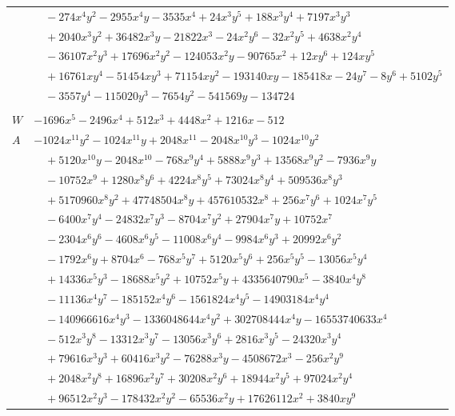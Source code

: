 \documentclass[11pt]{article}
\begin{document}
\begin{longtable}{@{}ll@{}}
 & $\quad -274x^{4}y^{2}-2955x^{4}y-3535x^{4}+24x^{3}y^{5}+188x^{3}y^{4}+7197x^{3}y^{3}$\\
 & $\quad +2040x^{3}y^{2}+36482x^{3}y-21822x^{3}-24x^{2}y^{6}-32x^{2}y^{5}+4638x^{2}y^{4}$\\
 & $\quad -36107x^{2}y^{3}+17696x^{2}y^{2}-124053x^{2}y-90765x^{2}+12xy^{6}+124xy^{5}$\\
 & $\quad +16761xy^{4}-51454xy^{3}+71154xy^{2}-193140xy-185418x-24y^{7}-8y^{6}+5102y^{5}$\\
 & $\quad -3557y^{4}-115020y^{3}-7654y^{2}-541569y-134724$\\
\addlinespace[3pt]
\multicolumn{2}{@{}l}{$g=2$, $i=35$, $m=16$, neighbours $2,4,9,12,13,18,20,21,29,34,39,40$}\\
$W$ & $-1696x^{5}-2496x^{4}+512x^{3}+4448x^{2}+1216x-512$\\
$A$ & $-1024x^{11}y^{2}-1024x^{11}y+2048x^{11}-2048x^{10}y^{3}-1024x^{10}y^{2}$\\
 & $\quad +5120x^{10}y-2048x^{10}-768x^{9}y^{4}+5888x^{9}y^{3}+13568x^{9}y^{2}-7936x^{9}y$\\
 & $\quad -10752x^{9}+1280x^{8}y^{6}+4224x^{8}y^{5}+73024x^{8}y^{4}+509536x^{8}y^{3}$\\
 & $\quad +5170960x^{8}y^{2}+47748504x^{8}y+457610532x^{8}+256x^{7}y^{6}+1024x^{7}y^{5}$\\
 & $\quad -6400x^{7}y^{4}-24832x^{7}y^{3}-8704x^{7}y^{2}+27904x^{7}y+10752x^{7}$\\
 & $\quad -2304x^{6}y^{6}-4608x^{6}y^{5}-11008x^{6}y^{4}-9984x^{6}y^{3}+20992x^{6}y^{2}$\\
 & $\quad -1792x^{6}y+8704x^{6}-768x^{5}y^{7}+5120x^{5}y^{6}+256x^{5}y^{5}-13056x^{5}y^{4}$\\
 & $\quad +14336x^{5}y^{3}-18688x^{5}y^{2}+10752x^{5}y+4335640790x^{5}-3840x^{4}y^{8}$\\
 & $\quad -11136x^{4}y^{7}-185152x^{4}y^{6}-1561824x^{4}y^{5}-14903184x^{4}y^{4}$\\
 & $\quad -140966616x^{4}y^{3}-1336048644x^{4}y^{2}+302708444x^{4}y-16553740633x^{4}$\\
 & $\quad -512x^{3}y^{8}-13312x^{3}y^{7}-13056x^{3}y^{6}+2816x^{3}y^{5}-24320x^{3}y^{4}$\\
 & $\quad +79616x^{3}y^{3}+60416x^{3}y^{2}-76288x^{3}y-4508672x^{3}-256x^{2}y^{9}$\\
 & $\quad +2048x^{2}y^{8}+16896x^{2}y^{7}+30208x^{2}y^{6}+18944x^{2}y^{5}+97024x^{2}y^{4}$\\
 & $\quad +96512x^{2}y^{3}-178432x^{2}y^{2}-65536x^{2}y+17626112x^{2}+3840xy^{9}$\\

\end{longtable}
\end{document}
